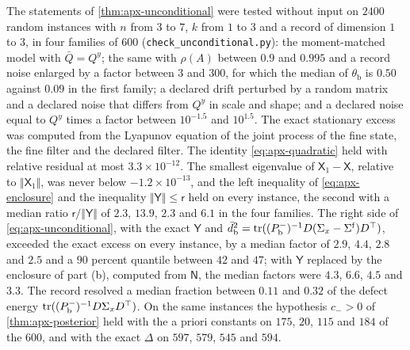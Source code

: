 \begin{numcheck}\label{chk:apx-unconditional}
The statements of \cref{thm:apx-unconditional} were tested without input on $2400$ random instances with $n$ from $3$ to $7$, $k$ from $1$ to $3$ and a record of dimension $1$ to $3$, in four families of $600$ (\texttt{check\_unconditional.py}): the moment-matched model with $\bar Q=Q^y$; the same with $\rho(A)$ between $0.9$ and $0.995$ and a record noise enlarged by a factor between $3$ and $300$, for which the median of $\theta_{\mathrm b}$ is $0.50$ against $0.09$ in the first family; a declared drift perturbed by a random matrix and a declared noise that differs from $Q^y$ in scale and shape; and a declared noise equal to $Q^y$ times a factor between $10^{-1.5}$ and $10^{1.5}$. The exact stationary excess was computed from the Lyapunov equation of the joint process of the fine state, the fine filter and the declared filter. The identity \cref{eq:apx-quadratic} held with relative residual at most $3.3\times10^{-12}$. The smallest eigenvalue of $\mathsf X_1-\mathsf X$, relative to $\Vert\mathsf X_1\Vert$, was never below $-1.2\times10^{-13}$, and the left inequality of \cref{eq:apx-enclosure} and the inequality $\Vert\mathsf Y\Vert\le\mathsf r$ held on every instance, the second with a median ratio $\mathsf r/\Vert\mathsf Y\Vert$ of $2.3$, $13.9$, $2.3$ and $6.1$ in the four families. The right side of \cref{eq:apx-unconditional}, with the exact $\mathsf Y$ and $\bar d_{\mathrm b}^2=\operatorname{tr}((P^-_{\mathrm b})^{-1}D(\Sigma_x-\Sigma^{\mathrm f})D^\top)$, exceeded the exact excess on every instance, by a median factor of $2.9$, $4.4$, $2.8$ and $2.5$ and a $90$ percent quantile between $42$ and $47$; with $\mathsf Y$ replaced by the enclosure of part (b), computed from $\mathsf N$, the median factors were $4.3$, $6.6$, $4.5$ and $3.3$. The record resolved a median fraction between $0.11$ and $0.32$ of the defect energy $\operatorname{tr}((P^-_{\mathrm b})^{-1}D\Sigma_xD^\top)$. On the same instances the hypothesis $c_->0$ of \cref{thm:apx-posterior} held with the a priori constants on $175$, $20$, $115$ and $184$ of the $600$, and with the exact $\Delta$ on $597$, $579$, $545$ and $594$.


\end{numcheck}
